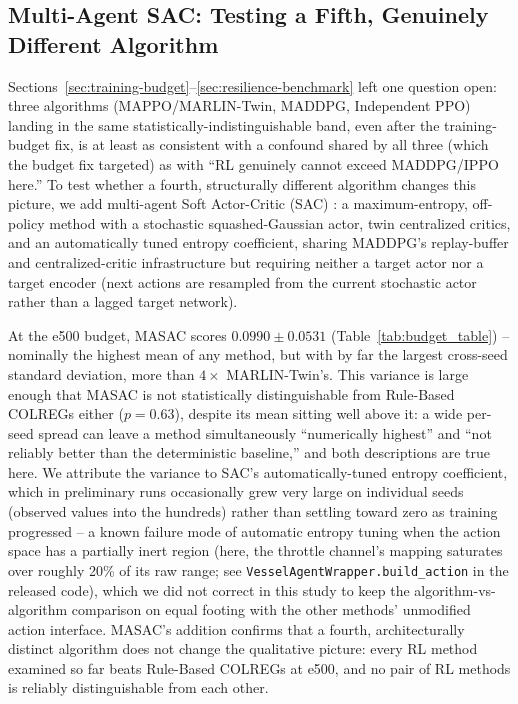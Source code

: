 \documentclass[journal,twocolumn,10pt]{IEEEtran}
\begin{document}
\subsection{Multi-Agent SAC: Testing a Fifth, Genuinely Different Algorithm}
\label{sec:sac}
Sections~\ref{sec:training-budget}--\ref{sec:resilience-benchmark} left one question open: three algorithms (MAPPO/MARLIN-Twin, MADDPG, Independent PPO) landing in the same statistically-indistinguishable band, even after the training-budget fix, is at least as consistent with a confound shared by all three (which the budget fix targeted) as with ``RL genuinely cannot exceed MADDPG/IPPO here.'' To test whether a fourth, structurally different algorithm changes this picture, we add multi-agent Soft Actor-Critic (SAC) \cite{haarnoja2018soft}: a maximum-entropy, off-policy method with a stochastic squashed-Gaussian actor, twin centralized critics, and an automatically tuned entropy coefficient, sharing MADDPG's replay-buffer and centralized-critic infrastructure but requiring neither a target actor nor a target encoder (next actions are resampled from the current stochastic actor rather than a lagged target network).

At the e500 budget, MASAC scores $0.0990 \pm 0.0531$ (Table~\ref{tab:budget_table}) -- nominally the highest mean of any method, but with by far the largest cross-seed standard deviation, more than $4\times$ MARLIN-Twin's. This variance is large enough that MASAC is not statistically distinguishable from Rule-Based COLREGs either ($p=0.63$), despite its mean sitting well above it: a wide per-seed spread can leave a method simultaneously ``numerically highest'' and ``not reliably better than the deterministic baseline,'' and both descriptions are true here. We attribute the variance to SAC's automatically-tuned entropy coefficient, which in preliminary runs occasionally grew very large on individual seeds (observed values into the hundreds) rather than settling toward zero as training progressed -- a known failure mode of automatic entropy tuning when the action space has a partially inert region (here, the throttle channel's mapping saturates over roughly 20\% of its raw range; see \texttt{VesselAgentWrapper.build\_action} in the released code), which we did not correct in this study to keep the algorithm-vs-algorithm comparison on equal footing with the other methods' unmodified action interface. MASAC's addition confirms that a fourth, architecturally distinct algorithm does not change the qualitative picture: every RL method examined so far beats Rule-Based COLREGs at e500, and no pair of RL methods is reliably distinguishable from each other.
\end{document}
